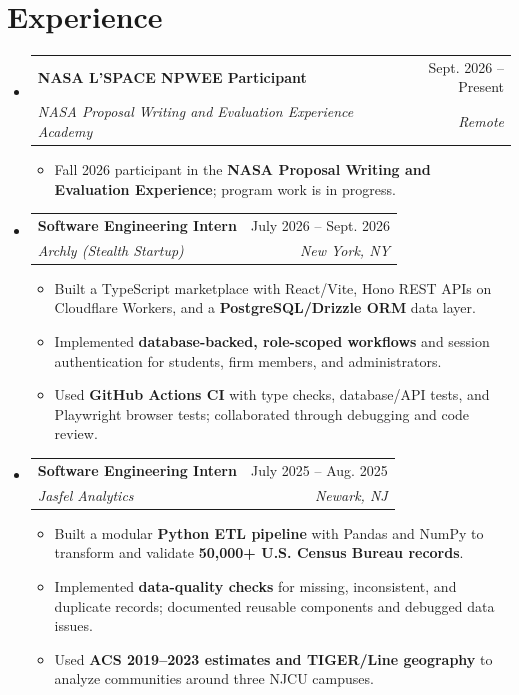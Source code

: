 \documentclass[letterpaper,10pt]{article}
\makeatletter
\newcommand{\resumeItem}[1]{\item\small{#1}}
\newcommand{\resumeSubheading}[4]{
  \vspace{1pt}\item
  \begin{tabular*}{0.97\textwidth}[t]{l@{\extracolsep{\fill}}r}
    \textbf{#1} & #2 \\
    \textit{\small #3} & \textit{\small #4} \\
  \end{tabular*}\vspace{-3pt}
}
\newcommand{\resumeSubHeadingListStart}{\begin{itemize}[leftmargin=0.15in,label={},itemsep=0pt,topsep=0pt]}
\newcommand{\resumeSubHeadingListEnd}{\end{itemize}}
\newcommand{\resumeItemListStart}{\begin{itemize}[leftmargin=0.15in,label=\textbullet,itemsep=-2pt,topsep=0pt]}
\newcommand{\resumeItemListEnd}{\end{itemize}\vspace{0pt}}
\makeatother
\begin{document}
\section{Experience}
\resumeSubHeadingListStart
  \resumeSubheading{NASA L'SPACE NPWEE Participant}{Sept. 2026 -- Present}
    {NASA Proposal Writing and Evaluation Experience Academy}{Remote}
    \resumeItemListStart
      \resumeItem{Fall 2026 participant in the \textbf{NASA Proposal Writing and Evaluation Experience}; program work is in progress.}
    \resumeItemListEnd
  \resumeSubheading{Software Engineering Intern}{July 2026 -- Sept. 2026}
    {Archly (Stealth Startup)}{New York, NY}
    \resumeItemListStart
      \resumeItem{Built a TypeScript marketplace with React/Vite, Hono REST APIs on Cloudflare Workers, and a \textbf{PostgreSQL/Drizzle ORM} data layer.}
      \resumeItem{Implemented \textbf{database-backed, role-scoped workflows} and session authentication for students, firm members, and administrators.}
      \resumeItem{Used \textbf{GitHub Actions CI} with type checks, database/API tests, and Playwright browser tests; collaborated through debugging and code review.}
    \resumeItemListEnd
  \resumeSubheading{Software Engineering Intern}{July 2025 -- Aug. 2025}
    {Jasfel Analytics}{Newark, NJ}
    \resumeItemListStart
      \resumeItem{Built a modular \textbf{Python ETL pipeline} with Pandas and NumPy to transform and validate \textbf{50,000+ U.S. Census Bureau records}.}
      \resumeItem{Implemented \textbf{data-quality checks} for missing, inconsistent, and duplicate records; documented reusable components and debugged data issues.}
      \resumeItem{Used \textbf{ACS 2019--2023 estimates and TIGER/Line geography} to analyze communities around three NJCU campuses.}
    \resumeItemListEnd
\resumeSubHeadingListEnd
\end{document}
